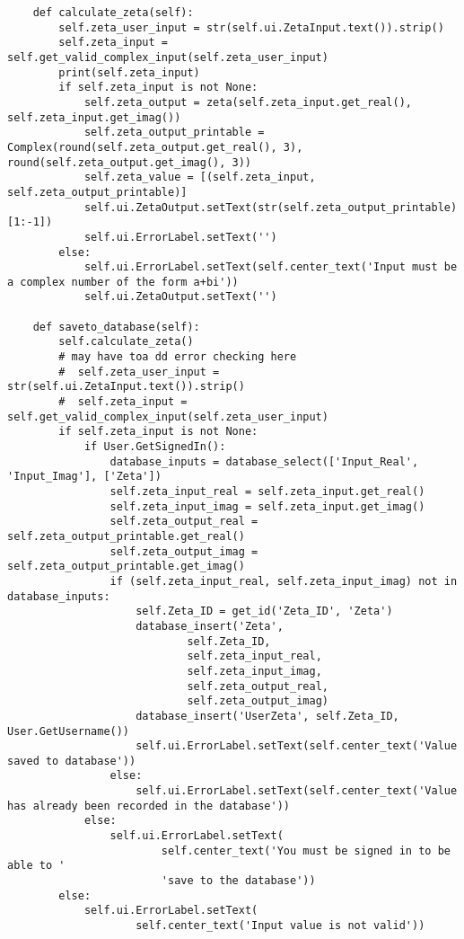 \documentclass{article}
\begin{document}
\begin{lstlisting}
    def calculate_zeta(self):
        self.zeta_user_input = str(self.ui.ZetaInput.text()).strip()
        self.zeta_input = self.get_valid_complex_input(self.zeta_user_input)
        print(self.zeta_input)
        if self.zeta_input is not None:
            self.zeta_output = zeta(self.zeta_input.get_real(), self.zeta_input.get_imag())
            self.zeta_output_printable = Complex(round(self.zeta_output.get_real(), 3), round(self.zeta_output.get_imag(), 3))
            self.zeta_value = [(self.zeta_input, self.zeta_output_printable)]
            self.ui.ZetaOutput.setText(str(self.zeta_output_printable)[1:-1])
            self.ui.ErrorLabel.setText('')
        else:
            self.ui.ErrorLabel.setText(self.center_text('Input must be a complex number of the form a+bi'))
            self.ui.ZetaOutput.setText('')

    def saveto_database(self):
        self.calculate_zeta()
        # may have toa dd error checking here
        #  self.zeta_user_input = str(self.ui.ZetaInput.text()).strip()
        #  self.zeta_input = self.get_valid_complex_input(self.zeta_user_input)
        if self.zeta_input is not None:
            if User.GetSignedIn():
                database_inputs = database_select(['Input_Real', 'Input_Imag'], ['Zeta'])
                self.zeta_input_real = self.zeta_input.get_real()
                self.zeta_input_imag = self.zeta_input.get_imag()
                self.zeta_output_real = self.zeta_output_printable.get_real()
                self.zeta_output_imag = self.zeta_output_printable.get_imag()
                if (self.zeta_input_real, self.zeta_input_imag) not in database_inputs:
                    self.Zeta_ID = get_id('Zeta_ID', 'Zeta')
                    database_insert('Zeta',
                            self.Zeta_ID,
                            self.zeta_input_real,
                            self.zeta_input_imag,
                            self.zeta_output_real,
                            self.zeta_output_imag)
                    database_insert('UserZeta', self.Zeta_ID, User.GetUsername())
                    self.ui.ErrorLabel.setText(self.center_text('Value saved to database'))
                else:
                    self.ui.ErrorLabel.setText(self.center_text('Value has already been recorded in the database'))
            else:
                self.ui.ErrorLabel.setText(
                        self.center_text('You must be signed in to be able to '
                        'save to the database'))
        else:
            self.ui.ErrorLabel.setText(
                    self.center_text('Input value is not valid'))


\end{lstlisting}
\end{document}
